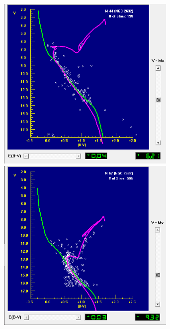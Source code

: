 \documentclass[12pt]{article}
\begin{document}
\begin{figure}[H]
    \includegraphics[width= 3.40in]{M44.png}
    \includegraphics[width= 3.40in]{M67.png}
  \label{hrmetal}
\end{figure}
\end{document}
